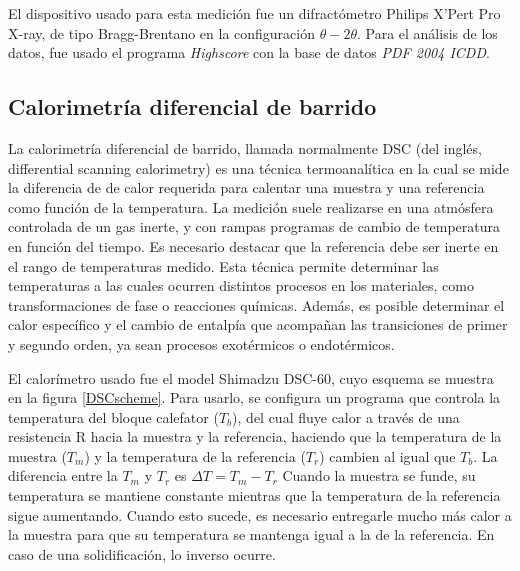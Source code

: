 \documentclass[12pt]{article}
\theoremstyle{definition}
\theoremstyle{remark}
\begin{document}
 El dispositivo usado para esta medición fue un difractómetro Philips X'Pert Pro X-ray, de tipo Bragg-Brentano en la configuración $\theta - 2\theta$.  Para el análisis de los datos, fue usado el programa \textit{Highscore} con la base de datos \textit{PDF 2004 ICDD}.
 
\subsection{Calorimetría diferencial de barrido}
La calorimetría diferencial de barrido, llamada normalmente DSC (del inglés, differential scanning calorimetry) es una técnica termoanalítica en la cual se mide la diferencia de de calor requerida para calentar una muestra y una referencia como función de la temperatura. La medición suele realizarse en una atmósfera controlada de un gas inerte, y con rampas programas de cambio de temperatura en función del tiempo.  Es necesario destacar que la referencia debe ser inerte en el rango de temperaturas medido.
Esta técnica permite determinar las temperaturas a las cuales ocurren distintos procesos en los materiales, como transformaciones de fase o reacciones químicas. Además, es posible determinar el calor específico y el cambio de entalpía que acompañan las transiciones de primer y segundo orden, ya sean procesos exotérmicos o endotérmicos.

El calorímetro usado fue el model Shimadzu DSC-60, cuyo esquema se muestra en la figura \ref{DSCscheme}. Para usarlo, se configura un programa que controla la temperatura del bloque calefator ($T_b$), del cual fluye calor a través de una resistencia R hacia la muestra y la referencia, haciendo que la temperatura de la muestra ($T_m$) y la temperatura de la referencia ($T_r$) cambien al igual que $T_b$. La diferencia entre la $T_m$ y $T_r$ es $\Delta T = T_m - T_r$
Cuando la muestra se funde, su temperatura se mantiene constante mientras que la temperatura de la referencia sigue aumentando. Cuando esto sucede, es necesario entregarle mucho más calor a la muestra para que su temperatura se mantenga igual a la de la referencia. En caso de una solidificación, lo inverso ocurre.
\end{document}
